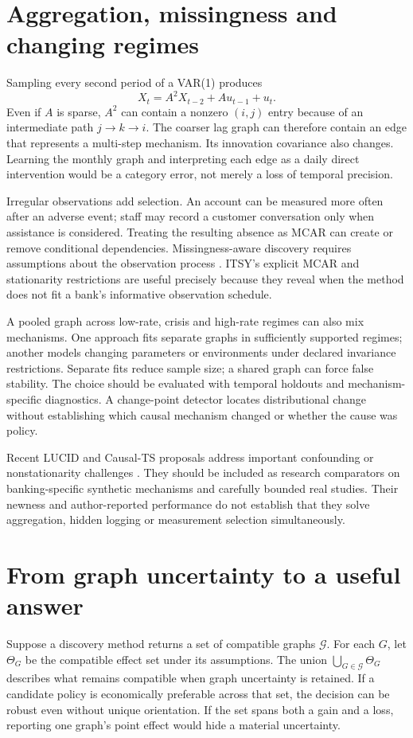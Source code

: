 \section{Aggregation, missingness and changing regimes}
Sampling every second period of a VAR(1) produces
\[
 X_t=A^2X_{t-2}+Au_{t-1}+u_t.
\]
Even if $A$ is sparse, $A^2$ can contain a nonzero $(i,j)$ entry
because of an intermediate path $j\to k\to i$. The coarser lag graph
can therefore contain an edge that represents a multi-step mechanism.
Its innovation covariance also changes. Learning the monthly graph and
interpreting each edge as a daily direct intervention would be a category
error, not merely a loss of temporal precision.

Irregular observations add selection. An account can be measured more
often after an adverse event; staff may record a customer conversation
only when assistance is considered. Treating the resulting absence as
MCAR can create or remove conditional dependencies. Missingness-aware
discovery requires assumptions about the observation process
\citep{tu2019}. ITSY's explicit MCAR and stationarity restrictions
\citep{itsy2026} are useful precisely because they reveal when the method
does not fit a bank's informative observation schedule.

A pooled graph across low-rate, crisis and high-rate regimes can also mix
mechanisms. One approach fits separate graphs in sufficiently supported
regimes; another models changing parameters or environments under declared
invariance restrictions. Separate fits reduce sample size; a shared graph
can force false stability. The choice should be evaluated with temporal
holdouts and mechanism-specific diagnostics. A change-point detector
locates distributional change without establishing which causal mechanism
changed or whether the cause was policy.

Recent LUCID and Causal-TS proposals address important confounding or
nonstationarity challenges \citep{lucid2026,causalts2026}. They should be
included as research comparators on banking-specific synthetic mechanisms
and carefully bounded real studies. Their newness and author-reported
performance do not establish that they solve aggregation, hidden logging
or measurement selection simultaneously.

\section{From graph uncertainty to a useful answer}
Suppose a discovery method returns a set of compatible graphs
$\mathcal G$. For each $G$, let $\Theta_G$ be the compatible effect
set under its assumptions. The union $\bigcup_{G\in\mathcal G}\Theta_G$
describes what remains compatible when graph uncertainty is retained.
If a candidate policy is economically preferable across that set, the
decision can be robust even without unique orientation. If the set spans
both a gain and a loss, reporting one graph's point effect would hide a
material uncertainty.

